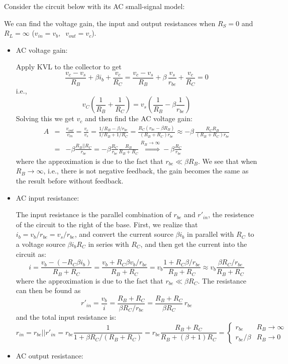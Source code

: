 \begin{itemize}
Consider the circuit below with its AC small-signal model:


We can find the voltage gain, the input and output resistances when 
$R_S=0$ and $R_L=\infty$ ($v_{in}=v_b,\;\;v_{out}=v_c$).
\begin{itemize}
\item AC voltage gain:

  Apply KVL to the collector to get
  \[
  \frac{v_c-v_s}{R_B}+\beta i_b+\frac{v_c}{R_C}
  =\frac{v_c-v_s}{R_B}+\beta \,\frac{v_s}{r_{be}}+\frac{v_c}{R_C}=0  
  \]
  i.e.,
  \[
  v_C\left(\frac{1}{R_B}+\frac{1}{R_C}\right)
  =v_s\left(\frac{1}{R_B}-\beta\frac{1}{r_{be}}\right)
  \]
  Solving this we get $v_c$ and then find the AC voltage gain:
  \begin{eqnarray}
  A&=&\frac{v_{out}}{v_{in}}=\frac{v_c}{v_s}
  =\frac{1/R_B-\beta/r_{be}}{1/R_B+1/R_C}=\frac{R_C(r_{be}-\beta R_B)}{(R_B+R_C)r_{be}}
  \approx-\beta \,\frac{R_C R_B}{(R_B+R_C)r_{be}}
  \nonumber\\
  &=&-\beta \frac{R_B||R_C}{r_{be}}=-\beta\frac{R_C}{r_{be}}\frac{R_B}{R_B+R_C}
  \stackrel{R_B\rightarrow\infty}{\Longrightarrow}-\beta\frac{R_C}{r_{be}}   
  \nonumber
  \end{eqnarray}
  where the approximation is due to the fact that $r_{be}\ll \beta R_B$.
  We see that when $R_B\rightarrow\infty$, i.e., there is not negative
  feedback, the gain becomes the same as the result before without feedback.

\item AC input resistance:

  The input resistance is the parallel combination of $r_{be}$ and
  $r'_{in}$, the resistence of the circuit to the right of the base. 
  First, we realize that $i_b=v_b/r_{be}=v_s/r_{be}$, and convert the
  current source $\beta i_b$ in parallel with $R_C$ to a voltage source
  $\beta i_bR_C$ in series with $R_C$, and then get the current into the
  circuit as:
  \[
  i=\frac{v_b-(-R_C\beta i_b)}{R_B+R_C}=\frac{v_b+R_C \beta v_b/r_{be}}{R_B+R_C}
  =v_b \frac{1+R_C \beta /r_{be}}{R_B+R_C}  
  \approx v_b \frac{\beta R_C /r_{be}}{R_B+R_C}
  \]
  where the approximation is due to the fact that $r_{be}\ll \beta R_C$. 
  The resistance can then be found as
  \[
  r'_{in}=\frac{v_b}{i}
  =\frac{R_B+R_C}{\beta R_C /r_{be}}=\frac{R_B+R_C}{\beta R_C}\,r_{be}
  \]
  and the total input resistance is:
  \[
  r_{in}=r_{be}||r'_{in}=r_{be}\frac{1}{1+\beta R_C/(R_B+R_C)}
  =r_{be}\frac{R_B+R_C}{R_B+(\beta+1) R_C}
  =\left\{\begin{array}{ll} r_{be} & R_B\rightarrow\infty\\
  r_{be}/\beta & R_B\rightarrow 0\end{array}\right.
  \]
\item AC output resistance:


\end{itemize}
\end{itemize}
